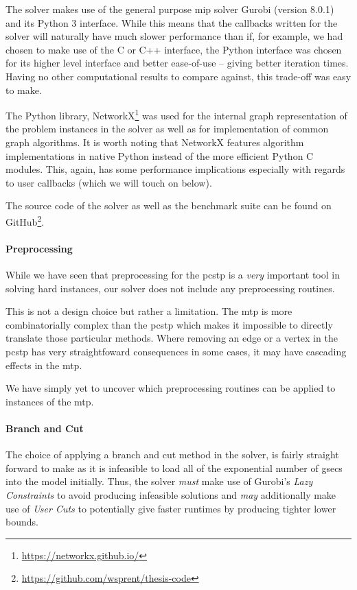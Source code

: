 The solver makes use of the general purpose \gls{mip} solver
Gurobi \citep{gurobi} (version 8.0.1)
and its Python 3 interface. While this means that the callbacks written for the solver
will naturally have much slower performance than if, for example, we had chosen to make
use of the C or C++ interface, the Python interface was chosen for its higher level interface
and better ease-of-use -- giving better iteration times. Having no other computational results
to compare against, this trade-off was easy to make.

The Python library,
NetworkX\footnote{\url{https://networkx.github.io/}} \citep{hagberg2008exploring}
was used for the internal graph representation of the
problem instances in the solver as well as for implementation of common
graph algorithms. It is worth noting that NetworkX features algorithm implementations
in native Python instead of the more efficient Python C modules. This, again, has some
performance implications especially with regards to user callbacks (which we will
 touch on below).

The source code of the solver as well as the benchmark suite
can be found on GitHub\footnote{\url{https://github.com/wsprent/thesis-code}}.

\paragraph{Preprocessing}

While we have seen that preprocessing for the \gls{pcstp} is a \textit{very} important
tool in solving hard instances, our solver does not include any preprocessing routines.

This is not a design choice but rather a limitation. The \gls{mtp} is
more combinatorially
complex than the \gls{pcstp} which makes it impossible to directly translate those particular
methods. Where removing an edge or a vertex in the \gls{pcstp}
has very straightfoward consequences in
some cases, it may have cascading effects in the \gls{mtp}.

We have simply yet to uncover which preprocessing routines can be applied to instances of
the \gls{mtp}.

\paragraph{Branch and Cut}
The choice of applying a branch and cut method in the solver, is fairly straight
forward to make as it is infeasible to load all of the exponential number of
\glspl{gsec} into the model initially. Thus, the solver
\textit{must} make use of
Gurobi's \textit{Lazy Constraints} to avoid producing infeasible solutions
and \textit{may} additionally make use of \textit{User Cuts} to potentially
give faster runtimes by producing tighter lower bounds.

